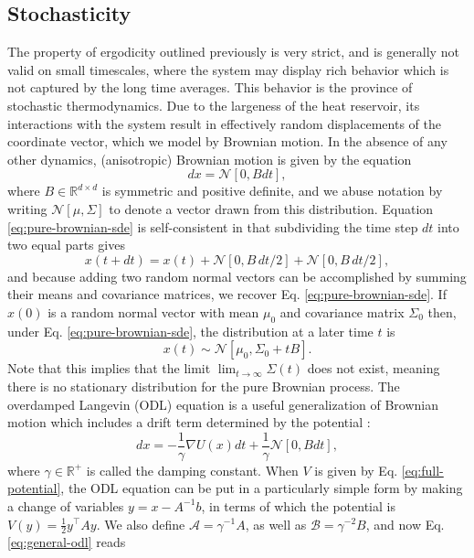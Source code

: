 \documentclass[prx,onecolumn,floatfix,longbibliography,notitlepage, nofootinbib]{revtex4-1}
\begin{document}
\begin{appendix}
\subsection{Stochasticity}
The property of ergodicity outlined previously is very strict, and is generally not valid on small timescales, where the system may display rich behavior which is not captured by the long time averages. This behavior is the province of stochastic thermodynamics. Due to the largeness of the heat reservoir, its interactions with the system result in effectively random displacements of the coordinate vector, which we model by Brownian motion. In the absence of any other dynamics, (anisotropic) Brownian motion is given by the equation \cite{doob1942brownian}
\begin{equation}
\label{eq:pure-brownian-sde}
    dx = \mathcal{N}[0, B dt],
\end{equation}
where $B\in \mathbb{R}^{d\times d}$ is symmetric and positive definite, and we abuse notation by writing $\mathcal{N}[\mu, \Sigma]$ to denote a vector drawn from this distribution. Equation \eqref{eq:pure-brownian-sde} is self-consistent in that subdividing the time step $dt$ into two equal parts gives
\begin{equation}
    x(t+dt) = x(t) + \mathcal{N}[0,B\,dt/2] +\mathcal{N}[0,
    B\,dt/2], 
\end{equation}
and because adding two random normal vectors can be accomplished by summing their means and covariance matrices, we recover Eq. \eqref{eq:pure-brownian-sde}. If $x(0)$ is a random normal vector with mean $\mu_0$ and covariance matrix $\Sigma_0$ then, under Eq. \eqref{eq:pure-brownian-sde}, the distribution at a later time $t$ is 
\begin{equation}
    x(t) \sim \mathcal{N}\left[\mu_0, \Sigma_0 + t B\right].
\end{equation}
Note that this implies that the limit $\lim_{t\to \infty} \Sigma(t)$ does not exist, meaning there is no stationary distribution for the pure Brownian process. The overdamped Langevin (ODL) equation is a useful generalization of Brownian motion which includes a drift term determined by the potential \cite{lemons1997paul, hatano2001steady}:
\begin{equation}
\label{eq:general-odl}
    dx = -\frac{1}{\gamma} \nabla U(x) dt +\frac{1}{\gamma}\mathcal{N}[0, B dt],
\end{equation}
where $\gamma \in \mathbb{R}^+$ is called the damping constant. When $V$ is given by Eq. \eqref{eq:full-potential}, the ODL equation can be put in a particularly simple form by making a change of variables $y = x - A^{-1} b$, in terms of which the potential is $V(y) = \frac{1}{2} y^\intercal A y$. We also define $\mathcal{A} = \gamma^{-1}A$, as well as $\mathcal{B} = \gamma^{-2}B$, and now Eq. \eqref{eq:general-odl} reads

\end{appendix}
\end{document}
